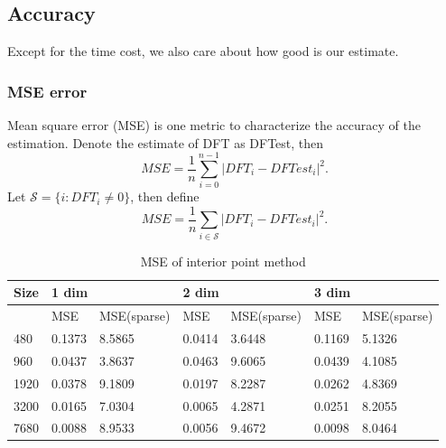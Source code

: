 \documentclass[final,onefignum,onetabnum]{siamart190516}
\begin{document}
\subsection{Accuracy}
Except for the time cost, we also care about how good is our estimate.
\subsubsection{MSE error}
Mean square error (MSE) is one metric to characterize the accuracy of the estimation. Denote the estimate of DFT as DFTest, then
\begin{equation}
    MSE = \frac{1}{n}\sum_{i=0}^{n-1} |DFT_i-DFTest_i|^2.
\end{equation}
Let $\mathcal{S} = \{i: DFT_i\neq 0\}$, then define
\begin{equation}
    MSE = \frac{1}{n}\sum_{i\in\mathcal{S}} |DFT_i-DFTest_i|^2.
\end{equation}
\begin{table}[H]
\caption{MSE of interior point method}
\begin{tabular}{|l|ll|ll|ll|}
\hline
Size & \multicolumn{2}{l|}{1 dim}                & \multicolumn{2}{l|}{2 dim}                & \multicolumn{2}{l|}{3 dim}                \\ \hline
     & \multicolumn{1}{l|}{MSE}    & MSE(sparse) & \multicolumn{1}{l|}{MSE}    & MSE(sparse) & \multicolumn{1}{l|}{MSE}    & MSE(sparse) \\ \hline
480  & \multicolumn{1}{l|}{0.1373} & 8.5865      & \multicolumn{1}{l|}{0.0414} & 3.6448      & \multicolumn{1}{l|}{0.1169} & 5.1326      \\ \hline
960  & \multicolumn{1}{l|}{0.0437} & 3.8637      & \multicolumn{1}{l|}{0.0463} & 9.6065      & \multicolumn{1}{l|}{0.0439} & 4.1085      \\ \hline
1920 & \multicolumn{1}{l|}{0.0378} & 9.1809      & \multicolumn{1}{l|}{0.0197} & 8.2287      & \multicolumn{1}{l|}{0.0262} & 4.8369      \\ \hline
3200 & \multicolumn{1}{l|}{0.0165} & 7.0304      & \multicolumn{1}{l|}{0.0065} & 4.2871      & \multicolumn{1}{l|}{0.0251} & 8.2055      \\ \hline
7680 & \multicolumn{1}{l|}{0.0088} & 8.9533      & \multicolumn{1}{l|}{0.0056} & 9.4672      & \multicolumn{1}{l|}{0.0098} & 8.0464      \\ \hline
\end{tabular}
\end{table}
\end{document}
